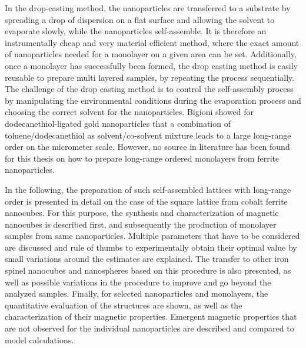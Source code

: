 \documentclass[\main/dresen_thesis.tex]{subfiles}
\begin{document}
  In the drop-casting method, the nanoparticles are transferred to a substrate by spreading a drop of dispersion on a flat surface and allowing the solvent to evaporate slowly, while the nanoparticles self-assemble.
  It is therefore an instrumentally cheap and very material efficient method, where the exact amount of nanoparticles needed for a monolayer on a given area can be set.
  Additionally, once a monolayer has successfully been formed, the drop casting method is easily reusable to prepare multi layered samples, by repeating the process sequentially.
  The challenge of the drop casting method is to control the self-assembly process by manipulating the environmental conditions during the evaporation process and choosing the correct solvent for the nanoparticles.
  Bigioni \etal \cite{Bigioni_2006_Kinet} showed for dodecanethiol-ligated gold nanoparticles that a combination of toluene/dodecanethiol as solvent/co-solvent mixture leads to a large long-range order on the micrometer scale.
  However, no source in literature has been found for this thesis on how to prepare long-range ordered monolayers from ferrite nanoparticles.

  In the following, the preparation of such self-assembled lattices with long-range order is presented in detail on the case of the square lattice from cobalt ferrite nanocubes.
  For this purpose, the synthesis and characterization of magnetic nanocubes is described first, and subsequently the production of monolayer samples from same nanoparticles.
  Multiple parameters that have to be considered are discussed and rule of thumbs to experimentally obtain their optimal value by small variations around the estimates are explained.
  The transfer to other iron spinel nanocubes and nanospheres based on this procedure is also presented, as well as possible variations in the procedure to improve and go beyond the analyzed samples.
  Finally, for selected nanoparticles and monolayers, the quantitative evaluation of the structures are shown, as well as the characterization of their magnetic properties. Emergent magnetic properties that are not observed for the individual nanoparticles are described and compared to model calculations.
\end{document}
